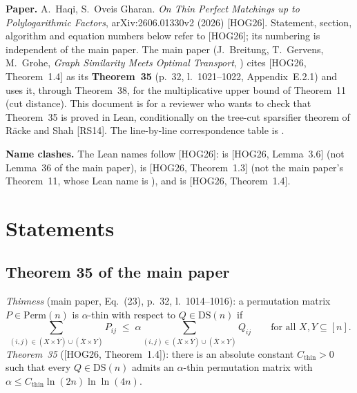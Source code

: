 

\sloppy
{}

\noindent\textbf{Paper.} A.~Haqi, S.~Oveis Gharan. \emph{On Thin Perfect Matchings up to Polylogarithmic
Factors}, arXiv:2606.01330v2 (2026) [HOG26]. Statement, section, algorithm and equation numbers below refer
to [HOG26]; its numbering is independent of the main paper. The main paper (J.~Breitung, T.~Gervens,
M.~Grohe, \emph{Graph Similarity Meets Optimal Transport},
) cites [HOG26, Theorem~1.4] as its
\textbf{Theorem~35} (p.~32, l.~1021--1022, Appendix~E.2.1) and uses it, through Theorem~38, for the
multiplicative upper bound of Theorem~11 (cut distance). This document is for a reviewer who wants to
check that Theorem~35 is proved in Lean, conditionally on the tree-cut sparsifier theorem of
R\"acke and Shah [RS14]. The line-by-line correspondence table is .
\par\smallskip

\noindent\textbf{Name clashes.} The Lean names follow [HOG26]:  is
[HOG26, Lemma~3.6] (not Lemma~36 of the main paper),  is
[HOG26, Theorem~1.3] (not the main paper's Theorem~11, whose Lean name is ),
and  is [HOG26, Theorem~1.4].

\section{Statements}

\subsection{Theorem 35 of the main paper}
\emph{Thinness} (main paper, Eq.~(23), p.~32, l.~1014--1016): a permutation matrix $P\in\mathrm{Perm}(n)$ is
$\alpha$-thin with respect to $Q\in\mathrm{DS}(n)$ if
\[ \sum_{(i,j)\in(X\times\overline Y)\cup(\overline X\times Y)} P_{ij}\;\le\;\alpha
   \sum_{(i,j)\in(X\times\overline Y)\cup(\overline X\times Y)} Q_{ij}\qquad\text{for all }X,Y\subseteq[n]. \]
\emph{Theorem~35} ([HOG26, Theorem~1.4]): there is an absolute constant $C_{\mathrm{thin}}>0$ such that every
$Q\in\mathrm{DS}(n)$ admits an $\alpha$-thin permutation matrix with $\alpha\le C_{\mathrm{thin}}\ln(2n)\ln\ln(4n)$.

